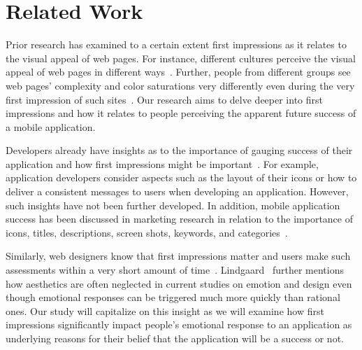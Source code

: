 \section{Related Work}



Prior research has examined to a certain extent first impressions as it relates to the visual appeal of web pages. For instance, different cultures perceive the visual appeal of web pages in different ways~\cite{needsource-paper that Gajos sent via email-Reinecke}. Further, people from different groups see web pages' complexity and color saturations very differently even during the very first impression of such sites~\cite{Reinecke:2013:PUF:2470654.2481281}. Our research aims to delve deeper into first impressions and how it relates to people perceiving the apparent future success of a mobile application.

Developers already have insights as to the importance of gauging success of their application and how first impressions might be important~\cite{wooldridge2010the}. For example, application developers consider aspects such as the layout of their icons or how to deliver a consistent messages to users when developing an application. However, such insights have not been further developed. In addition, mobile application success has been discussed in marketing research in relation to the importance of icons, titles, descriptions, screen shots, keywords, and categories~\cite{mureta12:app}.

Similarly, web designers know that first impressions matter and users make such assessments within a very short amount of time~\cite{needsource-attentionwebdesigners}. Lindgaard~\cite{needsource-attentionwebdesigners} further mentions how aesthetics are often neglected in current studies on emotion and design even though emotional responses can be triggered much more quickly than rational ones. Our study will capitalize on this insight as we will examine how first impressions  significantly impact people's emotional response to an application as underlying reasons for their belief that the application will be a success or not.